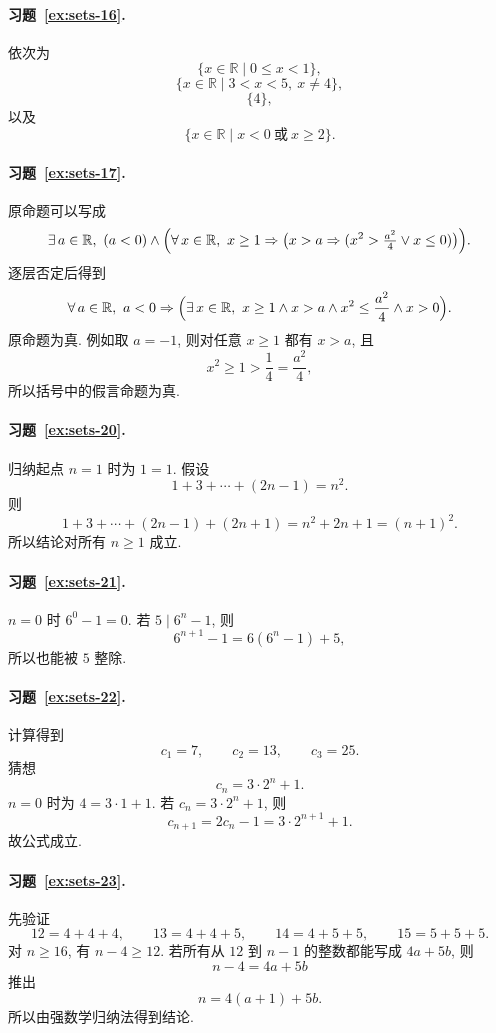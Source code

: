 \documentclass[usesamecnt, thmcnt=section, lang=cn, newtx, 10pt, scheme=chinese]{elegantbook}
\begin{document}
\paragraph*{习题~\ref{ex:sets-16}.}
依次为
\[
 \{x\in\mathbb R\mid 0\leq x<1\},
\]
\[
 \{x\in\mathbb R\mid 3<x<5,\ x\neq4\},
\]
\[
 \{4\},
\]
以及
\[
 \{x\in\mathbb R\mid x<0\ \text{或}\ x\geq2\}.
\]

\paragraph*{习题~\ref{ex:sets-17}.}
原命题可以写成
\[
 \exists\,a\in\mathbb R,\ (a<0)\wedge
 \Bigl(\forall\,x\in\mathbb R,\ x\geq1\Rightarrow
 \bigl(x>a\Rightarrow(x^2>\tfrac{a^2}{4}\vee x\leq0)\bigr)\Bigr).
\]
逐层否定后得到
\[
 \forall\,a\in\mathbb R,\ a<0\Rightarrow
 \Bigl(\exists\,x\in\mathbb R,\ x\geq1\wedge x>a\wedge
 x^2\leq\frac{a^2}{4}\wedge x>0\Bigr).
\]
原命题为真. 例如取 $a=-1$, 则对任意 $x\geq1$ 都有 $x>a$, 且
\[
 x^2\geq1>\frac14=\frac{a^2}{4},
\]
所以括号中的假言命题为真.

\paragraph*{习题~\ref{ex:sets-20}.}
归纳起点 $n=1$ 时为 $1=1$. 假设
\[
 1+3+\cdots+(2n-1)=n^2.
\]
则
\[
 1+3+\cdots+(2n-1)+(2n+1)
 =n^2+2n+1=(n+1)^2.
\]
所以结论对所有 $n\geq1$ 成立.

\paragraph*{习题~\ref{ex:sets-21}.}
$n=0$ 时 $6^0-1=0$. 若 $5\mid6^n-1$, 则
\[
 6^{n+1}-1
 =6(6^n-1)+5,
\]
所以也能被 $5$ 整除.

\paragraph*{习题~\ref{ex:sets-22}.}
计算得到
\[
 c_1=7,\qquad c_2=13,\qquad c_3=25.
\]
猜想
\[
 c_n=3\cdot2^n+1.
\]
$n=0$ 时为 $4=3\cdot1+1$. 若 $c_n=3\cdot2^n+1$, 则
\[
 c_{n+1}
 =2c_n-1
 =3\cdot2^{n+1}+1.
\]
故公式成立.

\paragraph*{习题~\ref{ex:sets-23}.}
先验证
\[
 12=4+4+4,\qquad
 13=4+4+5,\qquad
 14=4+5+5,\qquad
 15=5+5+5.
\]
对 $n\geq16$, 有 $n-4\geq12$. 若所有从 $12$ 到 $n-1$ 的整数都能写成 $4a+5b$, 则
\[
 n-4=4a+5b
\]
推出
\[
 n=4(a+1)+5b.
\]
所以由强数学归纳法得到结论.
\end{document}
